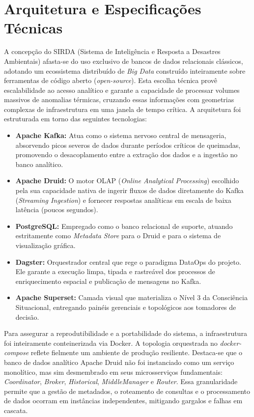 \section{Arquitetura e Especificações Técnicas}

A concepção do SIRDA (Sistema de Inteligência e Resposta a Desastres Ambientais) afasta-se do uso exclusivo de bancos de dados relacionais clássicos, adotando um ecossistema distribuído de \textit{Big Data} construído inteiramente sobre ferramentas de código aberto (\textit{open-source}). Esta escolha técnica provê escalabilidade ao acesso analítico e garante a capacidade de processar volumes massivos de anomalias térmicas, cruzando essas informações com geometrias complexas de infraestrutura em uma janela de tempo crítica. A arquitetura foi estruturada em torno das seguintes tecnologias:

\begin{itemize}
    \item \textbf{Apache Kafka:} Atua como o sistema nervoso central de mensageria, absorvendo picos severos de dados durante períodos críticos de queimadas, promovendo o desacoplamento entre a extração dos dados e a ingestão no banco analítico.
    \item \textbf{Apache Druid:} O motor OLAP (\textit{Online Analytical Processing}) escolhido pela sua capacidade nativa de ingerir fluxos de dados diretamente do Kafka (\textit{Streaming Ingestion}) e fornecer respostas analíticas em escala de baixa latência (poucos segundos).
    \item \textbf{PostgreSQL:} Empregado como o banco relacional de suporte, atuando estritamente como \textit{Metadata Store} para o Druid e para o sistema de visualização gráfica.
    \item \textbf{Dagster:} Orquestrador central que rege o paradigma DataOps do projeto. Ele garante a execução limpa, tipada e rastreável dos processos de enriquecimento espacial e publicação de mensagens no Kafka.
    \item \textbf{Apache Superset:} Camada visual que materializa o Nível 3 da Consciência Situacional, entregando painéis gerenciais e topológicos aos tomadores de decisão.
\end{itemize}

Para assegurar a reprodutibilidade e a portabilidade do sistema, a infraestrutura foi inteiramente conteinerizada via Docker. A topologia orquestrada no \textit{docker-compose} reflete fielmente um ambiente de produção resiliente. Destaca-se que o banco de dados analítico Apache Druid não foi instanciado como um serviço monolítico, mas sim desmembrado em seus microsserviços fundamentais: \textit{Coordinator}, \textit{Broker}, \textit{Historical}, \textit{MiddleManager} e \textit{Router}. Essa granularidade permite que a gestão de metadados, o roteamento de consultas e o processamento de dados ocorram em instâncias independentes, mitigando gargalos e falhas em cascata.

